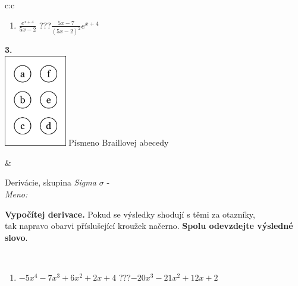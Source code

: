 \documentclass[10pt]{report}
\begin{document}
\begin{tabular}{c:c}
\begin{minipage}[c][104.5mm][t]{0.5\linewidth}
\begin{center}
\begin{minipage}{0.79\linewidth}
\begin{center}
\begin{varwidth}{\linewidth}
\begin{enumerate}
\item $\frac{e^{x+4}}{5x-2}$\quad \dotfill\; ???\;\dotfill \quad $\frac{5x-7}{(5x-2)^2}e^{x+4}$
\end{enumerate}
\end{varwidth}
\end{center}
\end{minipage}
\begin{minipage}{0.20\linewidth}
\begin{center}
{\Huge\bfseries 3.} \\[2mm]
\includegraphics[height=40mm]{../images/braille.png}
{\small Písmeno Braillovej abecedy}
\end{center}
\end{minipage}
\end{center}
\end{minipage}
&
\begin{minipage}[c][104.5mm][t]{0.5\linewidth}
\begin{center}
\vspace{7mm}
{\huge Derivácie, skupina \textit{Sigma $\sigma$} -}\\[5mm]
\textit{Meno:}\phantom{xxxxxxxxxxxxxxxxxxxxxxxxxxxxxxxxxxxxxxxxxxxxxxxxxxxxxxxxxxxxxxxxx}\\[5mm]
\begin{minipage}{0.95\linewidth}
\begin{center}
\textbf{Vypočítej derivace.} Pokud se výsledky shodují s těmi za otazníky,\\tak napravo obarvi příslušející kroužek načerno. \textbf{Spolu odevzdejte výsledné slovo}.
\end{center}
\end{minipage}
\\[1mm]
\begin{minipage}{0.79\linewidth}
\begin{center}
\begin{varwidth}{\linewidth}
\begin{enumerate}
\normalsize
\item $-5x^4-7x^3+6x^2+2x+4$\quad \dotfill\; ???\;\dotfill \quad $-20x^3-21x^2+12x+2$

\end{enumerate}
\end{varwidth}
\end{center}
\end{minipage}
\end{center}
\end{minipage}
\end{tabular}
\end{document}
